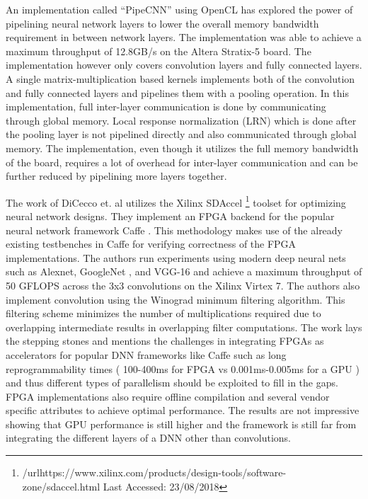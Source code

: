 An implementation called “PipeCNN” \cite{pipecnn} using OpenCL has explored the power of pipelining neural network layers to lower the overall memory bandwidth requirement in between network layers. The implementation was able to achieve a maximum throughput of 12.8GB/s on the Altera Stratix-5 board. The implementation however only covers convolution layers and fully connected layers. A single matrix-multiplication based kernels implements both of the convolution and fully connected layers and pipelines them with a pooling operation. In this implementation, full inter-layer communication is done by communicating through global memory. Local response normalization (LRN) which is done after the pooling layer is not pipelined directly and also communicated through global memory. The implementation, even though it utilizes the full memory bandwidth of the board, requires a lot of overhead for inter-layer communication and can be further reduced by pipelining more layers together.

The work of DiCecco et. al \cite{caffeinated} utilizes the Xilinx SDAccel \footnote{/url{https://www.xilinx.com/products/design-tools/software-zone/sdaccel.html} Last Accessed: 23/08/2018 } toolset for optimizing neural network designs. They implement an FPGA backend for the popular neural network framework Caffe \cite{caffe}. This methodology makes use of the already existing testbenches in Caffe for verifying correctness of the FPGA implementations. The authors run experiments using modern deep neural nets such as Alexnet\cite{alexnet}, GoogleNet \cite{szegedy2015going}, and VGG-16\cite{simonyan2014very} and achieve a maximum throughput of 50 GFLOPS across the 3x3 convolutions on the Xilinx Virtex 7. The authors also implement convolution using the Winograd \cite{lavin2016fast} minimum filtering algorithm. This filtering scheme minimizes the number of multiplications required due to overlapping intermediate results in overlapping filter computations. The work lays the stepping stones and mentions the challenges in integrating FPGAs as accelerators for popular DNN frameworks like Caffe such as long reprogrammability times ( 100-400ms for FPGA vs 0.001ms-0.005ms for a GPU ) and thus different types of parallelism should be exploited to fill in the gaps. FPGA implementations also require offline compilation and several vendor specific attributes to achieve optimal performance. The results are not impressive showing that GPU performance is still higher and the framework is still far from integrating the different layers of a DNN other than convolutions.


